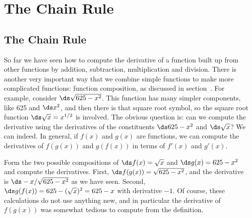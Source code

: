 
\chapter{The Chain Rule}


\section{The Chain Rule}

So far we have seen how to compute the derivative of a function built
up from other functions by addition, subtraction, multiplication and
division. There is another very important way that we combine simple
functions to make more complicated functions: function
composition, as discussed in
section~. For example, consider $\ds
\sqrt{625-x^2}$. This function has many simpler components, like 625
and $\ds x^2$, and then there is that square root symbol, so the
square root function $\ds \sqrt{x}=x^{1/2}$ is involved. The obvious
question is: can we compute the derivative using the derivatives of
the constituents $\ds 625-x^2$ and $\ds \sqrt{x}$? We can indeed. In
general, if $f(x)$ and $g(x)$ are functions, we can compute the
derivatives of $f(g(x))$ and $g(f(x))$ in terms of $f'(x)$ and
$g'(x)$. 

\begin{example} Form the two possible compositions of $\ds f(x)=\sqrt{x}$ and
$\ds g(x)=625-x^2$ and compute the derivatives.  First, $\ds
f(g(x))=\sqrt{625-x^2}$, and the derivative is $\ds -x/\sqrt{625-x^2}$
as we have seen. Second, $\ds g(f(x))=625-(\sqrt{x})^2=625-x$ with
derivative $-1$. Of course, these calculations do not use anything
new, and in particular the derivative of $f(g(x))$ was somewhat
tedious to compute from the definition.
\end{example}

